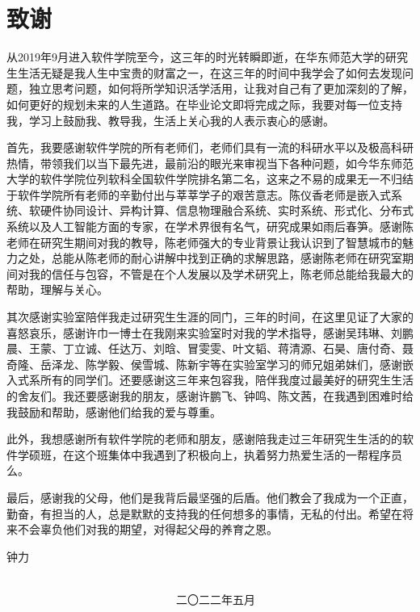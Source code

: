 {\kaishu
	\chapter*{致\qquad 谢}
	从2019年9月进入软件学院至今，这三年的时光转瞬即逝，在华东师范大学的研究生生活无疑是我人生中宝贵的财富之一，在这三年的时间中我学会了如何去发现问题，独立思考问题，如何将所学知识活学活用，让我对自己有了更加深刻的了解，如何更好的规划未来的人生道路。在毕业论文即将完成之际，我要对每一位支持我，学习上鼓励我、教导我，生活上关心我的人表示衷心的感谢。
	
	首先，我要感谢软件学院的所有老师们，老师们具有一流的科研水平以及极高科研热情，带领我们以当下最先进，最前沿的眼光来审视当下各种问题，如今华东师范大学的软件学院位列软科全国软件学院排名第二名，这来之不易的成果无一不归结于软件学院所有老师的辛勤付出与莘莘学子的艰苦意志。陈仪香老师是嵌入式系统、软硬件协同设计、异构计算、信息物理融合系统、实时系统、形式化、分布式系统以及人工智能方面的专家，在学术界很有名气，研究成果如雨后春笋。感谢陈老师在研究生期间对我的教导，陈老师强大的专业背景让我认识到了智慧城市的魅力之处，总能从陈老师的耐心讲解中找到正确的求解思路，感谢陈老师在研究室期间对我的信任与包容，不管是在个人发展以及学术研究上，陈老师总能给我最大的帮助，理解与关心。
	
	其次感谢实验室陪伴我走过研究生生涯的同门，三年的时间，在这里见证了大家的喜怒哀乐，感谢许巾一博士在我刚来实验室时对我的学术指导，感谢吴玮琳、刘鹏晨、王蒙、丁立诚、任达万、刘晗、冒雯雯、叶文韬、蒋清源、石昊、唐付奇、聂奇隆、岳泽龙、陈学毅、侯雪城、陈新宇等在实验室学习的师兄姐弟妹们，感谢嵌入式系所有的同学们。还要感谢这三年来包容我，陪伴我度过最美好的研究生生活的舍友们。我还要感谢我的朋友，感谢许鹏飞、钟鸣、陈文茜，在我遇到困难时给我鼓励和帮助，感谢他们给我的爱与尊重。
	
	此外，我想感谢所有软件学院的老师和朋友，感谢陪我走过三年研究生生活的的软件学硕班，在这个班集体中我遇到了积极向上，执着努力热爱生活的一帮程序员么。
	
	最后，感谢我的父母，他们是我背后最坚强的后盾。他们教会了我成为一个正直，勤奋，有担当的人，总是默默的支持我的任何想多的事情，无私的付出。希望在将来不会辜负他们对我的期望，对得起父母的养育之恩。

\vspace{0.2cm} \hspace{11.5cm}
钟力
\hspace{10.6cm} 

~~~~~~~~~~~~~~~~~~~~~~~~~~~~~~~~~~~~~~~~~~~~~~~~~~~~~~~~~~~~~~~~~~~~~~~~~~~~~~~~~~~~~~~~~~~~~~~~~~~~~~二〇二二年五月 }

